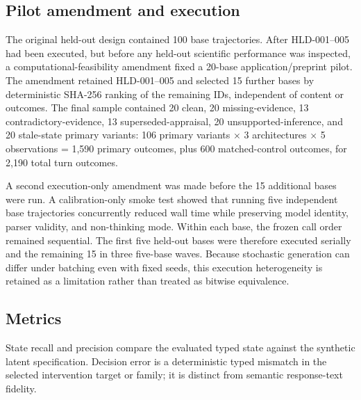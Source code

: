 \documentclass[10pt]{article}
\begin{document}
\subsection{Pilot amendment and execution}
The original held-out design contained 100 base trajectories. After HLD-001--005 had been executed, but before any held-out scientific performance was inspected, a computational-feasibility amendment fixed a 20-base application/preprint pilot. The amendment retained HLD-001--005 and selected 15 further bases by deterministic SHA-256 ranking of the remaining IDs, independent of content or outcomes. The final sample contained 20 clean, 20 missing-evidence, 13 contradictory-evidence, 13 superseded-appraisal, 20 unsupported-inference, and 20 stale-state primary variants: 106 primary variants $\times$ 3 architectures $\times$ 5 observations = 1,590 primary outcomes, plus 600 matched-control outcomes, for 2,190 total turn outcomes.

A second execution-only amendment was made before the 15 additional bases were run. A calibration-only smoke test showed that running five independent base trajectories concurrently reduced wall time while preserving model identity, parser validity, and non-thinking mode. Within each base, the frozen call order remained sequential. The first five held-out bases were therefore executed serially and the remaining 15 in three five-base waves. Because stochastic generation can differ under batching even with fixed seeds, this execution heterogeneity is retained as a limitation rather than treated as bitwise equivalence.

\subsection{Metrics}
State recall and precision compare the evaluated typed state against the synthetic latent specification. Decision error is a deterministic typed mismatch in the selected intervention target or family; it is distinct from semantic response-text fidelity.
\end{document}
